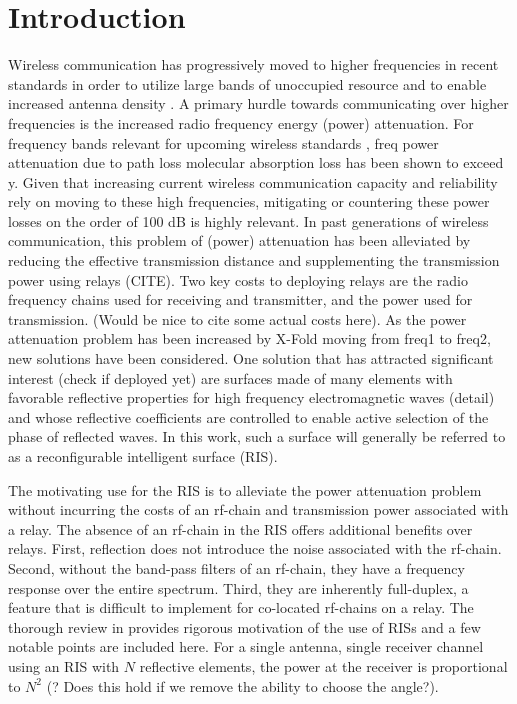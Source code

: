 \documentclass[12pt,a4paper]{report}
\begin{document}
\chapter{Introduction}
Wireless communication has progressively moved to higher frequencies in recent standards in order to utilize large bands of unoccupied resource
and to enable increased antenna density \cite{akyildiz2018combating}. A primary hurdle towards communicating over higher frequencies is the increased radio frequency energy (power) attenuation. For frequency bands relevant for upcoming wireless standards , freq power attenuation due to path loss  molecular absorption loss
has been shown to exceed y. Given that increasing current wireless communication capacity and reliability rely on moving to these high frequencies, mitigating or countering these power losses on the order of 100 dB is highly relevant.
In past generations of wireless communication, this problem of (power) attenuation has been alleviated by reducing the effective transmission distance 
and supplementing the transmission power using relays (CITE). Two key costs to deploying relays are the radio frequency chains used for receiving and transmitter, and the power used for transmission. (Would be nice to cite some actual costs here). As the power attenuation problem has been increased by X-Fold moving from freq1 to freq2, new solutions have been considered. One solution that has attracted significant interest (check if deployed yet) are surfaces made of many elements with favorable reflective properties for high frequency electromagnetic waves (detail) and whose reflective coefficients are controlled to enable active selection of the phase of reflected waves. In this work, such a surface will generally be referred to as a reconfigurable intelligent surface (RIS).
\par
The motivating use for the RIS is to alleviate the power attenuation problem without incurring the costs of an rf-chain and transmission power 
associated with a relay. The absence of an rf-chain in the RIS offers additional benefits over relays. First, reflection does not introduce the noise associated with the rf-chain. Second, without the band-pass filters of an rf-chain, they have a frequency response over the entire spectrum. Third, they are inherently full-duplex, a feature that is difficult to implement for co-located rf-chains on a relay. 
The thorough review in \cite{basar2019wireless} provides rigorous motivation of the use of RISs and a few notable points are included here.
For a single antenna, single receiver channel using an RIS with $N$ reflective elements, the power at the receiver is proportional to $N^2$ (? Does this hold if we remove the ability to choose the angle?).
\end{document}
